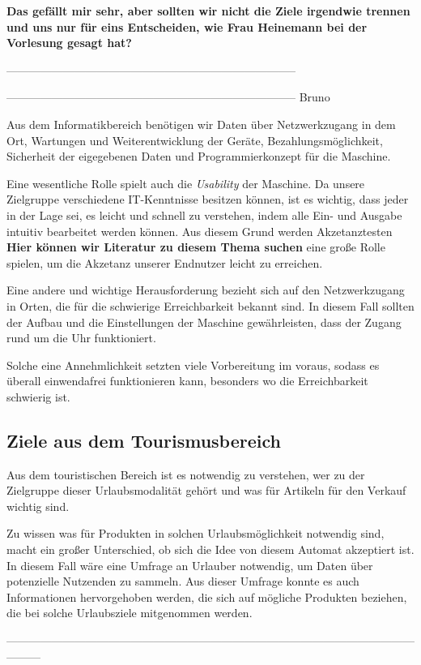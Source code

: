 \textbf{Das gefällt mir sehr, aber sollten wir nicht die Ziele irgendwie trennen und uns nur für eins Entscheiden, 
wie Frau Heinemann bei der Vorlesung gesagt hat?}


-----------------------------------------------------------------------------


----------------------------------------------------------------------------- Bruno

Aus dem Informatikbereich benötigen wir Daten über Netzwerkzugang in dem Ort, Wartungen und Weiterentwicklung der 
Geräte, Bezahlungsmöglichkeit, Sicherheit der eigegebenen Daten und Programmierkonzept für die Maschine.


Eine wesentliche Rolle spielt auch die \textit{Usability} der Maschine. Da unsere Zielgruppe verschiedene IT-Kenntnisse
besitzen können, ist es wichtig, dass jeder in der Lage sei, es leicht und schnell zu verstehen, indem alle Ein- und
Ausgabe intuitiv bearbeitet werden können. Aus diesem Grund werden Akzetanztesten \textbf{Hier können wir 
Literatur zu diesem Thema suchen} eine große Rolle spielen, um die Akzetanz unserer Endnutzer leicht zu erreichen. 


Eine andere und wichtige Herausforderung bezieht sich auf den Netzwerkzugang in Orten, die für die schwierige 
Erreichbarkeit bekannt sind. In diesem Fall sollten der Aufbau und die Einstellungen der Maschine gewährleisten,
 dass der Zugang rund um die Uhr funktioniert.


Solche eine Annehmlichkeit setzten viele Vorbereitung im voraus, sodass es überall einwendafrei funktionieren kann,
besonders wo die Erreichbarkeit schwierig ist. 


\subsection{Ziele aus dem Tourismusbereich}


Aus dem touristischen Bereich ist es notwendig zu verstehen, wer zu der Zielgruppe dieser Urlaubsmodalität gehört
und was für Artikeln für den Verkauf wichtig sind.


Zu wissen was für Produkten in solchen Urlaubsmöglichkeit notwendig sind, macht ein großer Unterschied, ob sich die
Idee von diesem Automat akzeptiert ist. In diesem Fall wäre eine Umfrage an Urlauber notwendig, um Daten über 
potenzielle Nutzenden zu sammeln. Aus dieser Umfrage konnte es auch Informationen hervorgehoben werden, die sich auf
mögliche Produkten beziehen, die bei solche Urlaubsziele mitgenommen werden.

---------------------------------------------------------------------------------------------------------------------